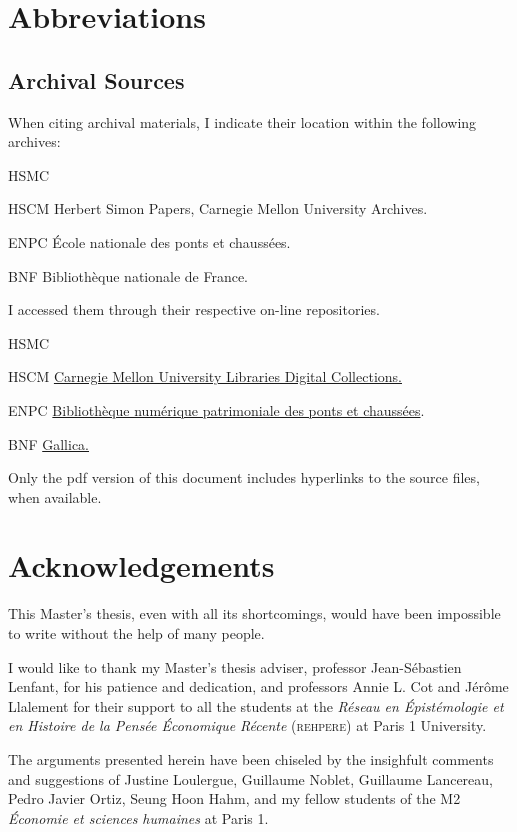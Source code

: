 \frontmatter
\pagestyle{plain}
\chapter*{Abbreviations} 
\section*{Archival Sources}

When citing archival materials, I indicate their location within the
following archives:

\begin{labeling}[:]{HSMC} 
\item[HSCM] Herbert Simon Papers, Carnegie Mellon University Archives.
\item[ENPC] École nationale des ponts et chaussées.
\item[BNF] Bibliothèque nationale de France. 
\end{labeling}

I accessed them through their respective on-line repositories.

\begin{labeling}[:]{HSMC} 
\item[HSCM] \href{https://digitalcollections.library.cmu.edu/portal/index.jsp}{Carnegie Mellon University Libraries Digital Collections.} 
\item[ENPC] \href{https://patrimoine.enpc.fr/}{Bibliothèque numérique patrimoniale des ponts et chaussées}.
\item[BNF] \href{https://gallica.bnf.fr/}{Gallica.}
\end{labeling}

Only the pdf version of this document includes hyperlinks to the source
files, when available.

\chapter{Acknowledgements} 
This Master's thesis, even with all its shortcomings, would have been
impossible to write without the help of many people.

I would like to thank my Master's thesis adviser, professor Jean-Sébastien
Lenfant, for his patience and dedication, and professors Annie L. Cot and
Jérôme Llalement for their support to all the students at the
\textit{Réseau en Épistémologie et en Histoire de la Pensée Économique Récente} (\textsc{rehpere}) at Paris 1 University.

The arguments presented herein have been chiseled by the insighfult
comments and suggestions of Justine Loulergue, Guillaume Noblet, Guillaume
Lancereau, Pedro Javier Ortiz, Seung Hoon Hahm, and my fellow students of
the M2 \textit{Économie et sciences humaines} at Paris 1.

